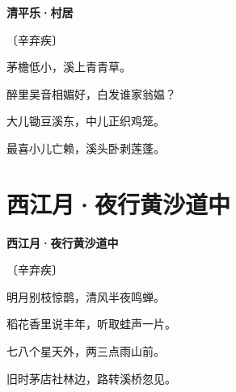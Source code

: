\documentclass[12pt,UTF-8,openany,fontset=none]{ctexbook}
\begin{document}

\begin{center}
    {\bfseries 清平乐·村居}

    \vspace{18pt}

    \begin{large}\xuwen
        〔辛弃疾〕
    \end{large}

\end{center}

    \vspace{18pt}  %

\begin{center}
    \begin{Large}

        茅檐低小，溪上青青草。

        醉里吴音相媚好，白发谁家翁媪？

        \vspace{18pt}  %

        大儿锄豆溪东，中儿正织鸡笼。

        最喜小儿亡赖，溪头卧剥莲蓬。

    \end{Large}

\end{center}

\vspace{8pt}
\clearpage

\section{西江月·夜行黄沙道中}


\begin{center}
    {\bfseries 西江月·夜行黄沙道中}

    \vspace{18pt}

    \begin{large}\xuwen
        〔辛弃疾〕
    \end{large}

\end{center}

    \vspace{18pt}  %

\begin{center}
    \begin{Large}

        明月别枝惊鹊，清风半夜鸣蝉。

        稻花香里说丰年，听取蛙声一片。

        \vspace{18pt}  %

        七八个星天外，两三点雨山前。

        旧时茅店社林边，路转溪桥忽见。

    \end{Large}

\end{center}
\end{document}
